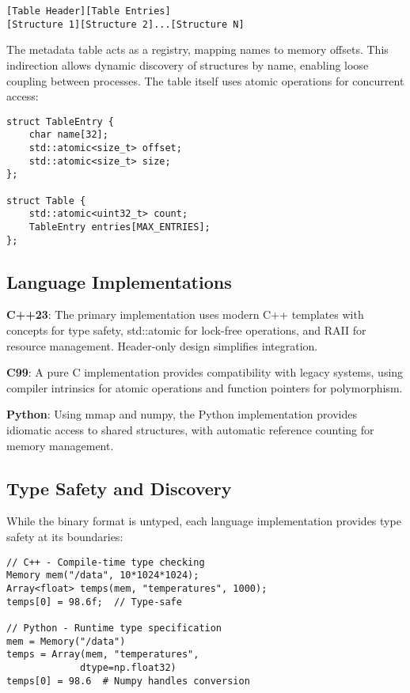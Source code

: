 \documentclass[10pt,conference]{IEEEtran}
\begin{document}
\begin{lstlisting}[caption={Memory Layout Structure},label={lst:layout}]
[Table Header][Table Entries]
[Structure 1][Structure 2]...[Structure N]
\end{lstlisting}

The metadata table acts as a registry, mapping names to memory offsets. This indirection allows dynamic discovery of structures by name, enabling loose coupling between processes. The table itself uses atomic operations for concurrent access:

\begin{lstlisting}[caption={Metadata Table Structure},label={lst:table}]
struct TableEntry {
    char name[32];
    std::atomic<size_t> offset;
    std::atomic<size_t> size;
};

struct Table {
    std::atomic<uint32_t> count;
    TableEntry entries[MAX_ENTRIES];
};
\end{lstlisting}

\subsection{Language Implementations}

\textbf{C++23}: The primary implementation uses modern C++ templates with concepts for type safety, std::atomic for lock-free operations, and RAII for resource management. Header-only design simplifies integration.

\textbf{C99}: A pure C implementation provides compatibility with legacy systems, using compiler intrinsics for atomic operations and function pointers for polymorphism.

\textbf{Python}: Using mmap and numpy, the Python implementation provides idiomatic access to shared structures, with automatic reference counting for memory management.

\subsection{Type Safety and Discovery}

While the binary format is untyped, each language implementation provides type safety at its boundaries:

\begin{lstlisting}[caption={Type-Safe Access Pattern},label={lst:typesafe}]
// C++ - Compile-time type checking
Memory mem("/data", 10*1024*1024);
Array<float> temps(mem, "temperatures", 1000);
temps[0] = 98.6f;  // Type-safe

// Python - Runtime type specification
mem = Memory("/data")
temps = Array(mem, "temperatures", 
             dtype=np.float32)
temps[0] = 98.6  # Numpy handles conversion
\end{lstlisting}
\end{document}
